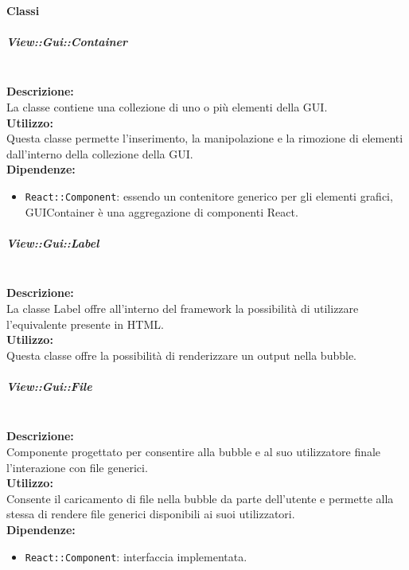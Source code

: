 \paragraph{Classi}\label{Classi}\mbox{}


\subparagraph{View\-::Gui\-::Container}\label{gui-container}\mbox{}\\
\textbf{Descrizione:}\\
La classe contiene una collezione di uno o più elementi della GUI.\\ 
\textbf{Utilizzo:}\\
Questa classe permette l'inserimento, la manipolazione e la rimozione di elementi dall'interno della collezione della GUI.\\
\textbf{Dipendenze:}
\begin{itemize}
	\item \texttt{React::Component}: essendo un contenitore generico per gli elementi grafici, GUIContainer è una aggregazione di componenti React.
\end{itemize}

\subparagraph{View\-::Gui\-::Label}\label{gui-label}\mbox{}\\
\textbf{Descrizione:}\\
La classe Label offre all'interno del framework la possibilità di utilizzare l'equivalente presente in HTML.\\
\textbf{Utilizzo:}\\
Questa classe offre la possibilità di renderizzare un output nella bubble.\\

\subparagraph{View\-::Gui\-::File}\label{gui-file}\mbox{}\\
\textbf{Descrizione:}\\
Componente progettato per consentire alla bubble e al suo utilizzatore finale l'interazione con file generici.\\
\textbf{Utilizzo:}\\
Consente il caricamento di file nella bubble da parte dell'utente e permette alla stessa di rendere file generici disponibili ai suoi utilizzatori.\\
\textbf{Dipendenze:}
\begin{itemize}
	\item \texttt{React::Component}: interfaccia implementata.
\end{itemize}

